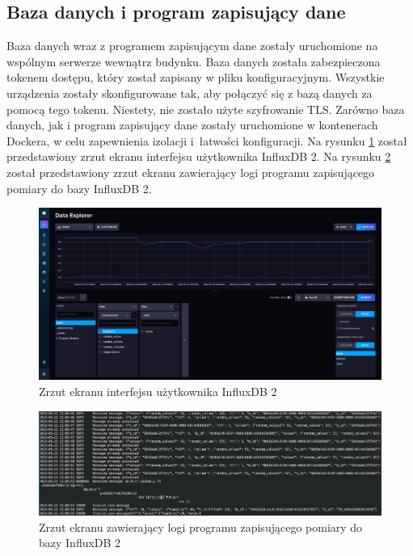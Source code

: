 \subsection{Baza danych i program zapisujący dane}
Baza danych wraz z programem zapisującym dane zostały uruchomione na wspólnym serwerze wewnątrz budynku. Baza danych została zabezpieczona tokenem dostępu, który został zapisany w pliku konfiguracyjnym. Wszystkie urządzenia zostały skonfigurowane tak, aby połączyć się z bazą danych za pomocą tego tokenu. Niestety, nie zostało użyte szyfrowanie TLS. Zarówno baza danych, jak i program zapisujący dane zostały uruchomione w kontenerach Dockera, w celu zapewnienia izolacji i~łatwości konfiguracji. Na rysunku \ref{rys:influxdb-web} został przedstawiony zrzut ekranu interfejsu użytkownika InfluxDB 2. Na rysunku \ref{rys:logi-connector} został przedstawiony zrzut ekranu zawierający logi programu zapisującego pomiary do bazy InfluxDB 2.

\begin{figure}[b!]
    \begin{center}
        \includegraphics[width=13cm]{pic/influxdb-web.png}
    \end{center}
    \caption{Zrzut ekranu interfejsu użytkownika InfluxDB 2}\label{rys:influxdb-web}
\end{figure}

\begin{figure}[b!]
    \begin{center}
        \includegraphics[width=13cm]{pic/logi-connector.png}
    \end{center}
    \caption{Zrzut ekranu zawierający logi programu zapisującego pomiary do bazy InfluxDB 2}\label{rys:logi-connector}
\end{figure}

